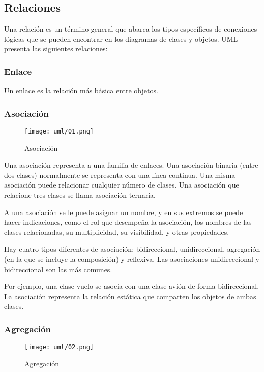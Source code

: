 \subsection*{Relaciones}
Una relación es un término general que abarca los tipos específicos de conexiones lógicas que se pueden encontrar en los diagramas de clases y objetos. UML presenta las siguientes relaciones:

\subsubsection*{Enlace}
Un enlace es la relación más básica entre objetos.

\subsubsection*{Asociación}

\begin{figure}[h!t] 
    \centering
    \texttt{[image: uml/01.png]}
    \caption{Asociación}
    \label{img:uml-asociacion}
\end{figure}

Una asociación representa a una familia de enlaces. Una asociación binaria (entre dos clases) normalmente se representa con una línea continua. Una misma asociación puede relacionar cualquier número de clases. Una asociación que relacione tres clases se llama asociación ternaria.

A una asociación se le puede asignar un nombre, y en sus extremos se puede hacer indicaciones, como el rol que desempeña la asociación, los nombres de las clases relacionadas, su multiplicidad, su visibilidad, y otras propiedades.

Hay cuatro tipos diferentes de asociación: bidireccional, unidireccional, agregación (en la que se incluye la composición) y reflexiva. Las asociaciones unidireccional y bidireccional son las más comunes.

Por ejemplo, una clase vuelo se asocia con una clase avión de forma bidireccional. La asociación representa la relación estática que comparten los objetos de ambas clases.

\subsubsection*{Agregación}


\begin{figure}[h!t] 
    \centering
    \texttt{[image: uml/02.png]}
    \caption{Agregación}
    \label{img:uml-agregacion}
\end{figure}


